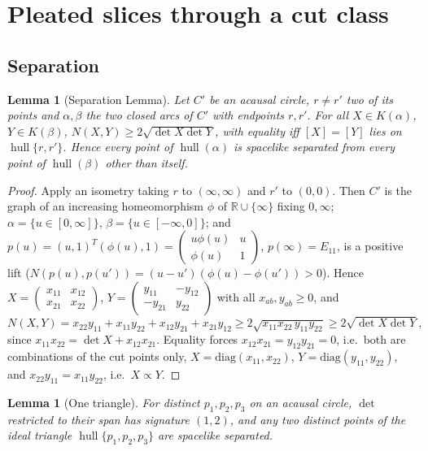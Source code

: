 \documentclass[aps,prd,onecolumn,superscriptaddress,nofootinbib,amsmath,amssymb,11pt]{revtex4-2}
\newtheorem{lemma}[theorem]{Lemma}
\theoremstyle{definition}
\newcommand{\R}{\mathbb{R}}
\newcommand{\hull}{\operatorname{hull}}
\begin{document}
\section{Pleated slices through a cut class}\label{sec:pleated}

\subsection{Separation}

\begin{lemma}[Separation Lemma]\label{lem:sep}
Let $C'$ be an acausal circle, $r\ne r'$ two of its points and $\alpha,\beta$ the two closed arcs of $C'$ with endpoints
$r,r'$. For all $X\in K(\alpha)$, $Y\in K(\beta)$, $N(X,Y)\ge2\sqrt{\det X\det Y}$, with equality iff $[X]=[Y]$ lies on
$\hull\{r,r'\}$. Hence every point of $\hull(\alpha)$ is spacelike separated from every point of $\hull(\beta)$ other than
itself.
\end{lemma}

\begin{proof}
Apply an isometry taking $r$ to $(\infty,\infty)$ and $r'$ to $(0,0)$. Then $C'$ is the graph of an increasing
homeomorphism $\phi$ of $\R\cup\{\infty\}$ fixing $0,\infty$; $\alpha=\{u\in[0,\infty]\}$, $\beta=\{u\in[-\infty,0]\}$; and
$p(u)=(u,1)^T(\phi(u),1)=\begin{pmatrix}u\phi(u)&u\\\phi(u)&1\end{pmatrix}$, $p(\infty)=E_{11}$, is a positive lift
($N(p(u),p(u'))=(u-u')(\phi(u)-\phi(u'))>0$). Hence
$X=\begin{pmatrix}x_{11}&x_{12}\\x_{21}&x_{22}\end{pmatrix}$, $Y=\begin{pmatrix}y_{11}&-y_{12}\\-y_{21}&y_{22}\end{pmatrix}$ with all
$x_{ab},y_{ab}\ge0$, and
\[
N(X,Y)=x_{22}y_{11}+x_{11}y_{22}+x_{12}y_{21}+x_{21}y_{12}\ge2\sqrt{x_{11}x_{22}\,y_{11}y_{22}}\ge2\sqrt{\det X\det Y},
\]
since $x_{11}x_{22}=\det X+x_{12}x_{21}$. Equality forces $x_{12}x_{21}=y_{12}y_{21}=0$, i.e.\ both are combinations of the cut
points only, $X=\mathrm{diag}(x_{11},x_{22})$, $Y=\mathrm{diag}(y_{11},y_{22})$, and $x_{22}y_{11}=x_{11}y_{22}$, i.e.\ $X\propto Y$.
\end{proof}

\begin{lemma}[One triangle]\label{lem:tri}
For distinct $p_1,p_2,p_3$ on an acausal circle, $\det$ restricted to their span has signature $(1,2)$, and any two distinct
points of the ideal triangle $\hull\{p_1,p_2,p_3\}$ are spacelike separated.
\end{lemma}
\end{document}

